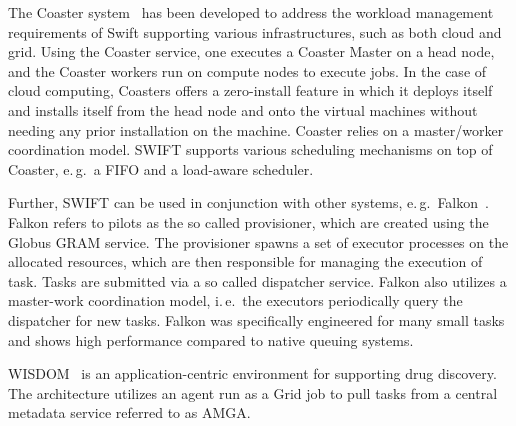 \documentclass{sig-alternate}
\begin{document}
The Coaster system~\cite{coasters} has been developed to address the workload
management requirements of Swift supporting various infrastructures, such as
both cloud and grid.
Using the Coaster service, one executes a Coaster Master on a head node, and
the Coaster workers run on compute nodes to execute jobs.
In the case of cloud computing, Coasters offers a zero-install feature in which
it deploys itself and installs itself from the head node and onto the virtual
machines without needing any prior installation on the machine.
Coaster relies on a master/worker coordination model.
SWIFT supports various scheduling mechanisms on top of Coaster, e.\,g.\ a FIFO
and a load-aware scheduler. 


Further, SWIFT can be used in conjunction with other \pilot systems,
e.\,g.\ Falkon~\cite{1362680}.  Falkon refers to pilots as the so
called provisioner, which are created using the Globus GRAM service.
The provisioner spawns a set of executor processes on the allocated
resources, which are then responsible for managing the execution of
task.  Tasks are submitted via a so called dispatcher service.  Falkon
also utilizes a master-work coordination model, i.\,e.\ the executors
periodically query the dispatcher for new tasks.  Falkon was
specifically engineered for many small tasks and shows high
performance compared to native queuing systems.

WISDOM~\cite{Ahn:2008:ITR:1444448.1445115,wisdom} is an
application-centric environment for supporting drug discovery.  The
architecture utilizes an agent run as a Grid job to pull tasks from a
central metadata service referred to as AMGA. 

\end{document}
